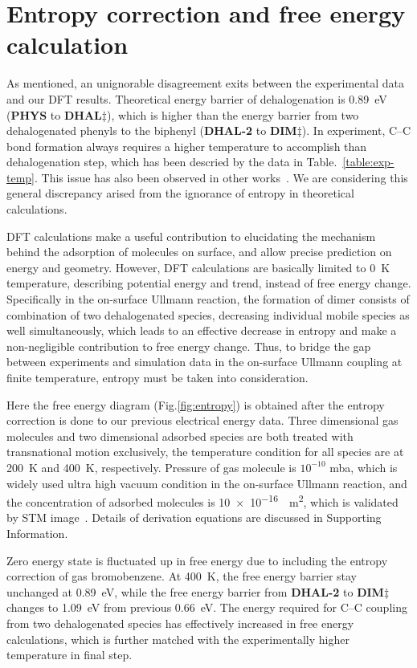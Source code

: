 \documentclass[aps,prb,amsmath,amssymb,11pt]{revtex4-1}
\newcommand{\zhzh}{\color{blue}}
\newcommand{\zhzh}{\color{blue}}
\newcommand{\sinfo}{Supporting Information}
\begin{document}
\section*{Entropy correction and free energy calculation}
{\zhzh
As mentioned, an unignorable disagreement exits between the experimental data and our DFT results. Theoretical energy barrier of dehalogenation is \SI{0.89}{\electronvolt} (\textbf{PHYS} to \textbf{DHAL$\ddagger$}), which is  higher than the energy barrier from two dehalogenated phenyls to the biphenyl (\textbf{DHAL-2} to \textbf{DIM$\ddagger$}). In experiment, C--C bond formation always requires a higher temperature to accomplish than dehalogenation step, which has been descried by the data in Table.~\ref{table:exp-temp}. This issue has also been observed in other works~\cite{jacs2013, pccp2010}. We are considering this general discrepancy arised from the ignorance of entropy in theoretical calculations. 

DFT calculations make a useful contribution to elucidating the mechanism behind the adsorption of molecules on surface, and allow precise prediction on energy and geometry. However, DFT calculations are basically limited to \SI{0}{\kelvin} temperature, describing potential energy and trend, instead of free energy change. Specifically in the on-surface Ullmann reaction, the formation of dimer consists of combination of two dehalogenated species, decreasing individual mobile species as well simultaneously,  which leads to an effective decrease in entropy and make a non-negligible contribution to free energy change. Thus, to bridge the gap between experiments and simulation data in the on-surface Ullmann coupling at finite temperature, entropy must be taken into consideration. 

Here the free energy diagram (Fig.\ref{fig:entropy}) is obtained after the entropy correction is done to our previous electrical energy data. Three dimensional gas molecules and two dimensional adsorbed species are both treated with transnational motion exclusively, the temperature condition for all species are at \SI{200}{\kelvin} and \SI{400}{\kelvin}, respectively. Pressure of gas molecule is $10^{-10}$ mba, which is widely used ultra high vacuum condition in the on-surface Ullmann reaction, and the concentration of adsorbed molecules is \SI{10e-16}{\per\metre\squared}, which is validated by STM image~\cite{ullmann_67}. Details of derivation equations are discussed in \sinfo.

Zero energy state is fluctuated up in free energy due to including the entropy correction of gas bromobenzene. At \SI{400}{\kelvin}, the free energy barrier stay unchanged at \SI{0.89}{\electronvolt}, while the free energy barrier from \textbf{DHAL-2} to \textbf{DIM$\ddagger$} changes to \SI{1.09}{\electronvolt} from previous \SI{0.66}{\electronvolt}. The energy required for C--C coupling from two dehalogenated species has effectively increased in free energy calculations, which is further matched with the experimentally higher temperature in final step.

}
\end{document}
